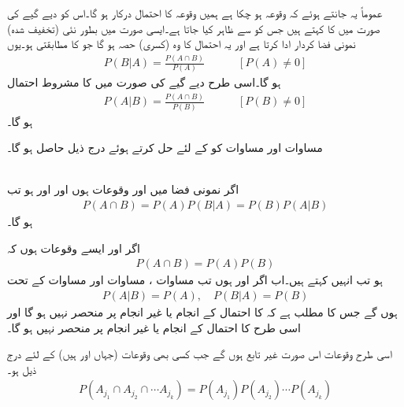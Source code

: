 عموماً یہ جانتے ہوئے کہ وقوعہ  ہو چکا ہے ہمیں وقوعہ  کا احتمال درکار ہو گا۔اس کو دیے گیے  کی صورت میں  کا    کہتے ہیں جس کو  سے ظاہر کیا جاتا ہے۔ایسی صورت میں  بطور  نئی (تخفیف شدہ) نمونی فضا کردار ادا کرتا ہے اور یہ احتمال  کا وہ  (کسری) حصہ ہو گا جو  کا مطابقتی ہو۔یوں
\begin{align}\label{مساوات_شماریات_مشروط_احتمال_الف}
P(B|A)=\frac{P(A\cap B)}{P(A)}\quad\quad\quad [P(A)\ne 0]
\end{align}  
ہو گا۔اسی طرح دیے گیے  کی صورت میں  کا مشروط احتمال 
\begin{align}\label{مساوات_شماریات_مشروط_احتمال_ب}
P(A|B)=\frac{P(A\cap B)}{P(B)}\quad\quad\quad [P(B)\ne 0]
\end{align}
ہو گا۔

مساوات  اور مساوات  کو  کے لئے حل کرتے ہوئے درج ذیل حاصل ہو گا۔

\quad {}\\
اگر نمونی فضا  میں  اور  وقوعات ہوں اور  اور  ہو تب 
\begin{align}\label{مساوات_شماریات_مشروط_احتمال_پ}
P(A\cap B)=P(A)P(B|A)=P(B)P(A|B)
\end{align}
ہو گا۔

اگر  اور  ایسے وقوعات ہوں کہ 
\begin{align}\label{مساوات_شماریات_مشروط_احتمال_ت}
P(A\cap B)=P(A)P(B)
\end{align}
ہو تب انہیں  کہتے ہیں۔اب اگر  اور  ہوں تب مساوات ، مساوات  اور مساوات  کے تحت 
\begin{align*}
P(A|B)=P(A),\quad P(B|A)=P(B)
\end{align*}
ہوں گے جس کا مطلب ہے کہ  کا احتمال  کے انجام یا غیر انجام پر منحصر نہیں ہو گا اور اسی طرح  کا احتمال  کے انجام یا غیر انجام پر منحصر نہیں ہو گا۔

اسی طرح  وقوعات  اس صورت غیر تابع ہوں گے جب کسی  بھی  وقوعات  (جہاں  اور  ہیں) کے لئے درج ذیل ہو۔
\begin{align}
P(A_{j_1}\cap A_{j_2}\cap \cdots A_{j_k})=P(A_{j_1})P(A_{j_2})\cdots P(A_{j_k})
\end{align}

